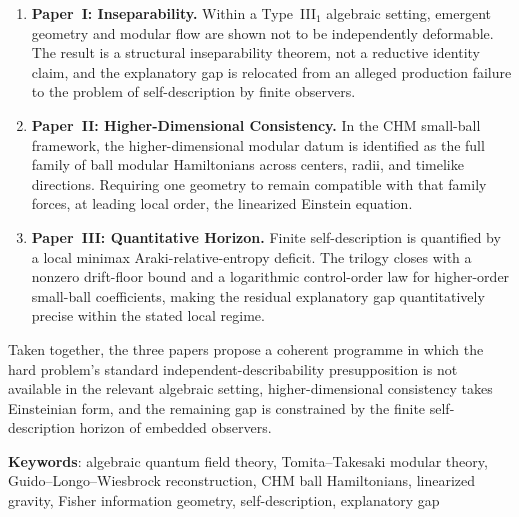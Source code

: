 \documentclass[12pt,a4paper,openany]{book}
\begin{document}
\begin{enumerate}
\item \textbf{Paper~I: Inseparability.} Within a Type~III$_1$
algebraic setting, emergent geometry and modular flow are shown not to
be independently deformable. The result is a structural inseparability
theorem, not a reductive identity claim, and the explanatory gap is
relocated from an alleged production failure to the problem of
self-description by finite observers.

\item \textbf{Paper~II: Higher-Dimensional Consistency.} In the CHM
small-ball framework, the higher-dimensional modular datum is identified
as the full family of ball modular Hamiltonians across centers, radii,
and timelike directions. Requiring one geometry to remain compatible
with that family forces, at leading local order, the linearized Einstein
equation.

\item \textbf{Paper~III: Quantitative Horizon.} Finite self-description
is quantified by a local minimax Araki-relative-entropy deficit.
The trilogy closes with a nonzero drift-floor bound and a logarithmic
control-order law for higher-order small-ball coefficients, making the
residual explanatory gap quantitatively precise within the stated local
regime.
\end{enumerate}

Taken together, the three papers propose a coherent programme in which
the hard problem's standard independent-describability presupposition is
not available in the relevant algebraic setting, higher-dimensional
consistency takes Einsteinian form, and the remaining gap is constrained
by the finite self-description horizon of embedded observers.

\bigskip
\noindent\textbf{Keywords}: algebraic quantum field theory, Tomita--Takesaki
modular theory, Guido--Longo--Wiesbrock reconstruction, CHM ball
Hamiltonians, linearized gravity, Fisher information geometry,
self-description, explanatory gap

\tableofcontents

\mainmatter






\end{document}
